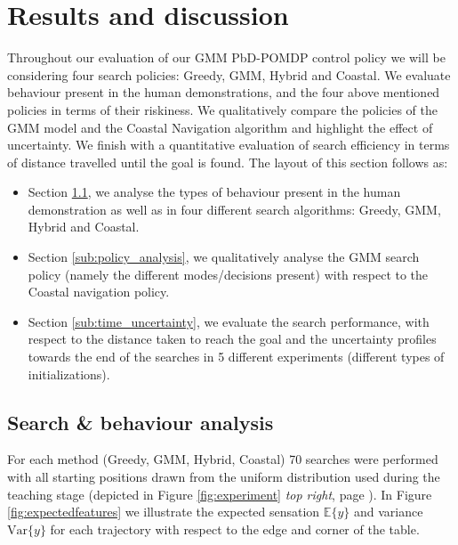 \section{Results and discussion}\label{chap3:results}

Throughout our evaluation of our GMM PbD-POMDP control policy we will be considering four search policies: Greedy, GMM, Hybrid and 
Coastal. We evaluate behaviour present in the human demonstrations, and the four above mentioned policies in terms 
of their riskiness. We qualitatively compare the policies of the GMM model and the Coastal Navigation algorithm and highlight the 
effect of uncertainty. We finish with a quantitative evaluation of search efficiency in terms of distance travelled until the goal is found.
The layout of this section follows as:
\begin{itemize}
 \item Section \ref{sub:search_behaviour}, we analyse the types of behaviour present in the human demonstration as well as in
four different search algorithms: Greedy, GMM, Hybrid and Coastal.
 \item Section \ref{sub:policy_analysis}, we qualitatively analyse the GMM search policy (namely the different modes/decisions present) 
 with respect to the Coastal navigation policy.
 \item Section \ref{sub:time_uncertainty}, we evaluate the search performance, with respect to the distance taken to reach the goal and the uncertainty profiles towards the end of 
the searches in 5 different experiments (different types of initializations). 
\end{itemize}
\FloatBarrier
\subsection{Search \& behaviour analysis}\label{sub:search_behaviour}

For each method (Greedy, GMM, Hybrid, Coastal) 70 searches were performed with all starting positions drawn from the
uniform distribution used during the teaching stage (depicted in Figure \ref{fig:experiment} \textit{top right}, page \pageref{fig:experiment}). 
In Figure \ref{fig:expectedfeatures} we illustrate the expected sensation $\mathbb{E}\{y\}$ and  variance $\mathrm{Var}\{y\}$ for each trajectory with respect 
to the edge and corner of the table. 

